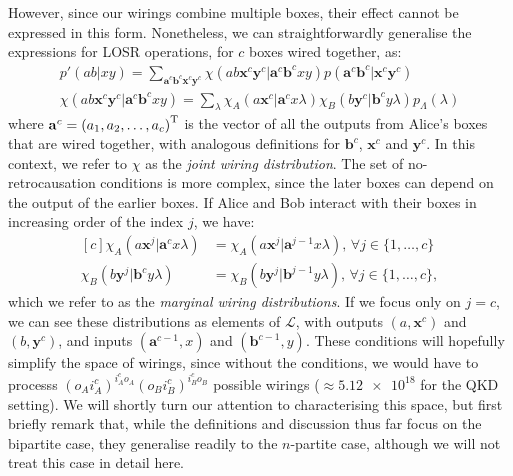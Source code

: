 \documentclass[10pt, a4paper]{article}
\numberwithin{equation}{section} %
\theoremstyle{definition}
\theoremstyle{plain}
\newcommand{\dintv}[2]{\mathopen\{#1,\ldots,#2\mathclose\}}
\newcommand{\?}{\mathrel{?}} %
\newcommand{\cvec}[1]{\boldsymbol{\mathbf{#1}}}    %
\newcommand{\Ls}{\mathcal{L}}
\begin{document}
      However, since our wirings combine multiple boxes, their effect cannot be expressed in this form. Nonetheless, we can straightforwardly generalise the expressions for LOSR operations, for \(c\) boxes wired together, as:
      \begin{gather}
        p'(ab|xy) = \sum_{\cvec{a}^c\cvec{b}^c\cvec{x}^c\cvec{y}^c} \chi(ab\cvec{x}^c\cvec{y}^c|\cvec{a}^c\cvec{b}^cxy) p(\cvec{a}^c\cvec{b}^c|\cvec{x}^c\cvec{y}^c)\label{eqn:wiringprobdef} \\
        \chi(ab\cvec{x}^c\cvec{y}^c|\cvec{a}^c\cvec{b}^cxy) = \sum_{\lambda} \chi_A(a\cvec{x}^c|\cvec{a}^cx \lambda) \chi_B(b\cvec{y}^c|\cvec{b}^cy \lambda) p_{\Lambda}(\lambda)\label{eqn:wiringfndef}
      \end{gather}
      where \(\cvec{a}^c = {(a_1, a_2, \ldots, a_c)}^{\rm T}\) is the vector of all the outputs from Alice's boxes that are wired together, with analogous definitions for \(\cvec{b}^c\), \(\cvec{x}^c\) and \(\cvec{y}^c\). In this context, we refer to \(\chi\) as the \emph{joint wiring distribution}. The set of no-retrocausation conditions is more complex, since the later boxes can depend on the output of the earlier boxes. If Alice and Bob interact with their boxes in increasing order of the index \(j\), we have:
      \begin{equation}
        \begin{aligned}[c]
        \chi_A(a\cvec{x}^j|\cvec{a}^cx\lambda) &= \chi_A(a\cvec{x}^j|\cvec{a}^{j-1}x\lambda),\,\forall j \in \dintv{1}{c} \\
        \chi_B(b\cvec{y}^j|\cvec{b}^cy\lambda) &= \chi_B(b\cvec{y}^j|\cvec{b}^{j-1}y\lambda),\,\forall j \in \dintv{1}{c},
        \end{aligned}\label{eqn:wiringnoretro}
      \end{equation}
      which we refer to as the \emph{marginal wiring distributions}. If we focus only on \(j = c\), we can see these distributions as elements of \(\Ls\), with outputs \((a, \cvec{x}^c)\) and \((b, \cvec{y}^c)\), and inputs \((\cvec{a}^{c-1}, x)\) and \((\cvec{b}^{c-1}, y)\). These conditions will hopefully simplify the space of wirings, since without the conditions, we would have to processs \({(o_A i_A^c)}^{i_A^c o_A} {(o_B i_B^c)}^{i_B^c o_B}\) possible wirings (\(\approx \num{5.12e18}\) for the QKD setting). We will shortly turn our attention to characterising this space, but first briefly remark that, while the definitions and discussion thus far focus on the bipartite case, they generalise readily to the \(n\)-partite case, although we will not treat this case in detail here.
\end{document}
